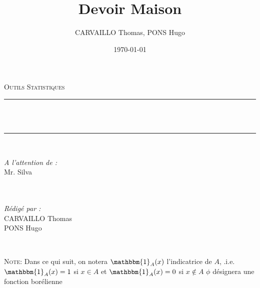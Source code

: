 \documentclass[12pt]{article}
\title{Devoir Maison}
\author{CARVAILLO Thomas, PONS Hugo}
\date{\today}
\makeatletter
\let\thetitle\@title
\newcommand{\1}{\mathbbm{1}}
\theoremstyle{definition}\newtheorem{defn}{Définition}
\theoremstyle{definition}\newtheorem{exm}{Exemple}
\theoremstyle{definition}\newtheorem{rem}{Remarque}
\theoremstyle{definition}\newtheorem{algo}{Algorithme}
\theoremstyle{remark}\newtheorem{exo}{Exercice}
\theoremstyle{remark}\newtheorem{nota}{Notation}
\theoremstyle{definition}\newtheorem{1q}{Question}
\theoremstyle{definition}\newtheorem{2q}{Question}
\theoremstyle{definition}\newtheorem{3q}{Question}
\theoremstyle{definition}\newtheorem{4q}{Question}
\theoremstyle{definition}\newtheorem{2qs1}{}
\theoremstyle{definition}\newtheorem{2qs2}{}
\theoremstyle{definition}\newtheorem{2qs3}{}
\theoremstyle{definition}\newtheorem{2qs4}{}
\theoremstyle{definition}\newtheorem{4qs2}{}
\theoremstyle{definition}\newtheorem{4qs3}{}
\makeatother
\begin{document}

\begin{titlepage}
	\centering
    \vspace*{0.5 cm}
    \textsc{\LARGE Outils Statistiques}\\[1.0 cm]
	\vspace{1.5cm}
	\rule{\linewidth}{0.2 mm} \\[0.4 cm]
	{ \huge \bfseries  \thetitle}\\ %
	\rule{\linewidth}{0.2 mm} \\[1.5 cm]
	
	\begin{minipage}{0.4\textwidth}
		\begin{flushleft} \large
			\emph{A l'attention de :}\\
			Mr. Silva\\
			\phantom{a}\\
			\phantom{a}\\
		\end{flushleft}
	\end{minipage}
	\begin{minipage}{0.5\textwidth}
    	\begin{flushright} \large
		\emph{Rédigé par :}\\
		CARVAILLO Thomas \\
		PONS Hugo \\
		\end{flushright}
	\end{minipage}\\[2 cm]
\end{titlepage}


\tableofcontents

\textsc{Note:} Dans ce qui suit, on notera $\1_A(x)$ l'indicatrice de $A$, .i.e. $\1_A(x) = 1$ si $x\in A$ et $\1_A(x) = 0$ si $x\notin A$\newline
$\phi$ désignera une fonction borélienne

\pagebreak
\end{document}
